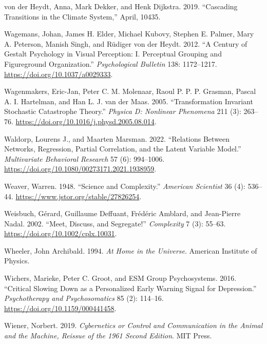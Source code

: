\documentclass[
  a4paper,
  DIV=11,
  numbers=noendperiod,
  oneside]{scrreprt}
\newlength{\cslhangindent}
\newenvironment{CSLReferences}[2] %
 {\begin{list}{}{%
  \setlength{\itemindent}{0pt}
  \setlength{\leftmargin}{0pt}
  \setlength{\parsep}{0pt}
  \ifodd #1
   \setlength{\leftmargin}{\cslhangindent}
   \setlength{\itemindent}{-1\cslhangindent}
  \fi
  \setlength{\itemsep}{#2\baselineskip}}}
 {\end{list}}
\begin{document}
\begin{CSLReferences}{1}{0}
von der Heydt, Anna, Mark Dekker, and Henk Dijkstra. 2019. {``Cascading
Transitions in the Climate System,''} April, 10435.

Wagemans, Johan, James H. Elder, Michael Kubovy, Stephen E. Palmer, Mary
A. Peterson, Manish Singh, and Rüdiger von der Heydt. 2012. {``A Century
of {Gestalt} Psychology in Visual Perception: {I}. {Perceptual} Grouping
and Figure\textendash ground Organization.''} \emph{Psychological
Bulletin} 138: 1172--1217. \url{https://doi.org/10.1037/a0029333}.

Wagenmakers, Eric-Jan, Peter C. M. Molenaar, Raoul P. P. P. Grasman,
Pascal A. I. Hartelman, and Han L. J. van der Maas. 2005.
{``Transformation Invariant Stochastic Catastrophe Theory.''}
\emph{Physica D: Nonlinear Phenomena} 211 (3): 263--76.
\url{https://doi.org/10.1016/j.physd.2005.08.014}.

Waldorp, Lourens J., and Maarten Marsman. 2022. {``Relations Between
{Networks}, {Regression}, {Partial Correlation}, and the {Latent
Variable Model}.''} \emph{Multivariate Behavioral Research} 57 (6):
994--1006. \url{https://doi.org/10.1080/00273171.2021.1938959}.

Weaver, Warren. 1948. {``Science and {Complexity}.''} \emph{American
Scientist} 36 (4): 536--44. \url{https://www.jstor.org/stable/27826254}.

Weisbuch, Gérard, Guillaume Deffuant, Frédéric Amblard, and Jean-Pierre
Nadal. 2002. {``Meet, Discuss, and Segregate!''} \emph{Complexity} 7
(3): 55--63. \url{https://doi.org/10.1002/cplx.10031}.

Wheeler, John Archibald. 1994. \emph{At {Home} in the {Universe}}.
{American Institute of Physics}.

Wichers, Marieke, Peter C. Groot, and ESM Group Psychosystems. 2016.
{``Critical {Slowing Down} as a {Personalized Early Warning Signal} for
{Depression}.''} \emph{Psychotherapy and Psychosomatics} 85 (2):
114--16. \url{https://doi.org/10.1159/000441458}.

Wiener, Norbert. 2019. \emph{Cybernetics or {Control} and
{Communication} in the {Animal} and the {Machine}, {Reissue} of the 1961
Second Edition}. {MIT Press}.


\end{CSLReferences}
\end{document}
